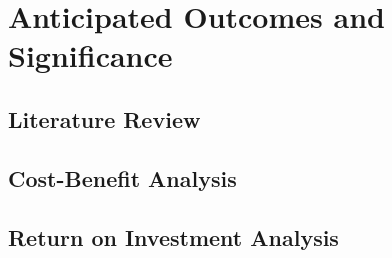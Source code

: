 
\renewcommand{\thechapter}{7}

\chapter{Anticipated Outcomes and Significance}

\section{Literature Review}

\section{Cost-Benefit Analysis}

\section{Return on Investment Analysis}
